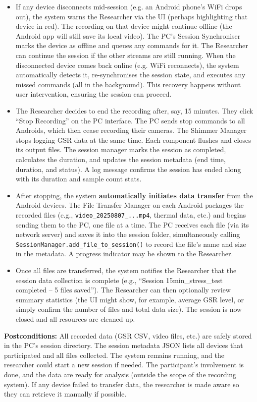 \begin{itemize}
  \item If any device disconnects mid-session (e.g. an Android phone's WiFi drops out), the system warns the Researcher via the UI (perhaps highlighting that device in red). The recording on that device might continue offline (the Android app will still save its local video). The PC's Session Synchroniser marks the device as offline and queues any commands for it. The Researcher can continue the session if the other streams are still running. When the disconnected device comes back online (e.g. WiFi reconnects), the system automatically detects it, re-synchronises the session state, and executes any missed commands (all in the background). This recovery happens without user intervention, ensuring the session can proceed.
  \item The Researcher decides to end the recording after, say, 15 minutes. They click ``Stop Recording'' on the PC interface. The PC sends stop commands to all Androids, which then cease recording their cameras. The Shimmer Manager stops logging GSR data at the same time. Each component flushes and closes its output files. The session manager marks the session as completed, calculates the duration, and updates the session metadata (end time, duration, and status). A log message confirms the session has ended along with its duration and sample count stats.
  \item After stopping, the system \textbf{automatically initiates data transfer} from the Android devices. The File Transfer Manager on each Android packages the recorded files (e.g., \texttt{video\_20250807\_...mp4}, thermal data, etc.) and begins sending them to the PC, one file at a time. The PC receives each file (via its network server) and saves it into the session folder, simultaneously calling \texttt{SessionManager.add\_file\_to\_session()} to record the file's name and size in the metadata. A progress indicator may be shown to the Researcher.
  \item Once all files are transferred, the system notifies the Researcher that the session data collection is complete (e.g., ``Session 15min\_stress\_test completed -- 5 files saved''). The Researcher can then optionally review summary statistics (the UI might show, for example, average GSR level, or simply confirm the number of files and total data size). The session is now closed and all resources are cleaned up.
\end{itemize}

\textbf{Postconditions:} All recorded data (GSR CSV, video files, etc.) are safely stored in the PC's session directory. The session metadata JSON lists all devices that participated and all files collected. The system remains running, and the researcher could start a new session if needed. The participant's involvement is done, and the data are ready for analysis (outside the scope of the recording system). If any device failed to transfer data, the researcher is made aware so they can retrieve it manually if possible.


